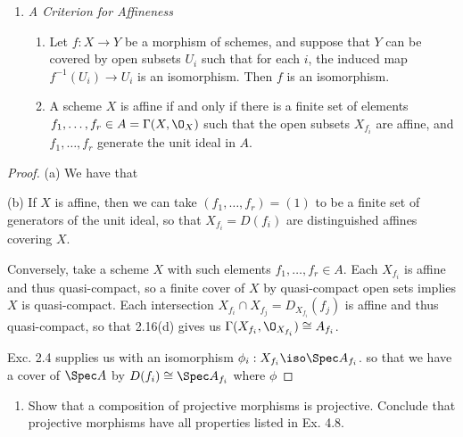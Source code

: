 \documentclass[12pt]{amsart}
\begin{document}
\begin{enumerate}
  \item[2.17.] {
      \emph{A Criterion for Affineness}
      \begin{enumerate}
        \item Let $f:X\to Y$ be a morphism of schemes, and suppose that $Y$ can be covered by open subsets $U_i$ such that for each $i$, the induced map $f^{-1}(U_i)\to U_i$ is an isomorphism.
          Then $f$ is an isomorphism.
        \item A scheme $X$ is affine if and only if there is a finite set of elements $f_1,\ldots, f_r\in A=\Gamma(X,\O_X)$ such that the open subsets $X_{f_i}$ are affine, and $f_1,\ldots, f_r$ generate the unit ideal in $A$.
      \end{enumerate}
    }
\end{enumerate}

\begin{proof}
  (a) We have that

  (b) If $X$ is affine, then we can take $(f_1,\ldots, f_r)=(1)$ to be a finite set of generators of the unit ideal, so that $X_{f_i}=D(f_i)$ are distinguished affines covering $X$.
  
  Conversely, take a scheme $X$ with such elements $f_1,\ldots, f_r\in A$.
  Each $X_{f_i}$ is affine and thus quasi-compact, so a finite cover of $X$ by quasi-compact open sets implies $X$ is quasi-compact.
  Each intersection $X_{f_i}\cap X_{f_j}=D_{X_{f_i}}(f_j)$ is affine and thus quasi-compact, so that 2.16(d) gives us $\Gamma(X_{f_i},\O_{X_{f_i}})\cong A_{f_i}$.

  Exc. 2.4 supplies us with an isomorphism $\phi_i:X_{f_i}\iso\Spec A_{f_i}$.
  so that we have a cover of $\Spec A$ by $D(f_i)\cong \Spec A_{f_i}$ where $\phi$
\end{proof}

\begin{enumerate}
  \item[4.9.] {
      Show that a composition of projective morphisms is projective.
      Conclude that projective morphisms have all properties listed in Ex. 4.8.
    }
\end{enumerate}
\end{document}
